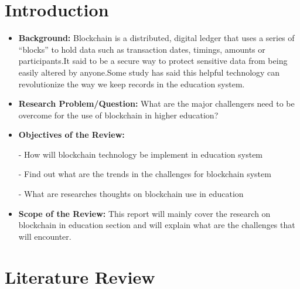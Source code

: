\documentclass[12pt,a4paper]{article}
\begin{document}
\section{Introduction}
\begin{itemize}
    \item \textbf{Background:} Blockchain is a distributed, digital ledger that uses a series of “blocks” to hold data such as transaction dates, timings, amounts or participants.It said to be a secure way to protect sensitive data from being easily altered by anyone.Some study has said this helpful technology can revolutionize the way we keep records in the education system.
    \item \textbf{Research Problem/Question:} What are the major challengers need to be overcome for the use of blockchain in higher education?
    \item \textbf{Objectives of the Review:}
    
     - How will blockchain technology be implement in education system
     
     - Find out what are the trends in the challenges for blockchain system

     - What are researches thoughts on blockchain use in education
    \item \textbf{Scope of the Review:} This report will mainly cover the research on blockchain in education section and will explain what are the challenges that will encounter.
\end{itemize}


\section{Literature Review}
\end{document}

